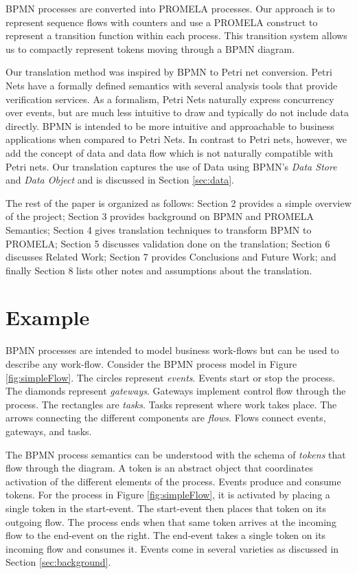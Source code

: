 \documentclass[11pt,twocolumn]{article}
\begin{document}
BPMN processes are converted into PROMELA processes. Our approach is to represent sequence flows with counters and use a PROMELA construct to represent a transition function within each process. This transition system allows us to compactly represent tokens moving through a BPMN diagram.

Our translation method was inspired by BPMN to Petri net conversion. Petri Nets have a formally defined semantics with several analysis tools that provide verification services. As a formalism, Petri Nets naturally express concurrency over events, but are much less intuitive to draw and typically do not include data directly. BPMN is intended to be more intuitive and approachable to business applications when compared to Petri Nets. In contrast to Petri nets, however, we add the concept of data and data flow which is not naturally compatible with Petri nets. Our translation captures the use of Data using BPMN's \emph{Data Store} and \emph{Data Object} and is discussed in Section \ref{sec:data}.

The rest of the paper is organized as follows: Section 2 provides a simple overview of the project; Section 3 provides background on BPMN and PROMELA Semantics; Section 4 gives translation techniques to transform BPMN to PROMELA; Section 5 discusses validation done on the translation; Section 6 discusses Related Work; Section 7 provides Conclusions and Future Work; and finally Section 8 lists other notes and assumptions about the translation.
\section{Example}

BPMN processes are intended to model business work-flows but can be used to describe any work-flow. Consider the BPMN process model in Figure \ref{fig:simpleFlow}. The circles represent \emph{events}. Events start or stop the process. The diamonds represent \emph{gateways}. Gateways implement control flow through the process. The rectangles are \emph{tasks}. Tasks represent where work takes place. The arrows connecting the different components are \emph{flows}. Flows connect events, gateways, and tasks. 

The BPMN process semantics can be understood with the schema of \emph{tokens} that flow through the diagram. A token is an abstract object that coordinates activation of the different elements of the process. Events produce and consume tokens. For the process in Figure \ref{fig:simpleFlow}, it is activated by placing a single token in the start-event. The start-event then places that token on its outgoing flow. The process ends when that same token arrives at the incoming flow to the end-event on the right. The end-event takes a single token on its incoming flow and consumes it. Events come in several varieties as discussed in Section \ref{sec:background}. 
\end{document}
